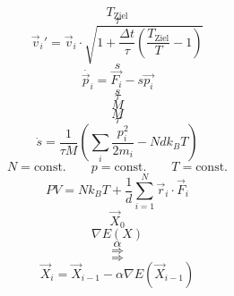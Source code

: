 \documentclass{scrreprt}
\begin{document}
\begin{equation}
T_\text{Ziel}
\end{equation}
\begin{equation}
\tau
\end{equation}
\begin{equation}
  \vec v_i' = \vec v_i \cdot \sqrt{1 + \frac{\Delta t}{\tau} \left(\frac{T_\text{Ziel}}{T} - 1\right)}
  \label{eq:berendsen}
\end{equation}
\begin{equation}
s
\end{equation}
\begin{equation}
  \dot{\vec p_i} = \vec{F_i} - s \vec{p_i}
\end{equation}
\begin{equation}
s
\end{equation}
\begin{equation}
\tau
\end{equation}
\begin{equation}
M
\end{equation}
\begin{equation}
M
\end{equation}
\begin{equation}
\tau
\end{equation}
\begin{equation}
  \dot s = \frac{1}{\tau M} \left(\sum_i{\frac{p_i^2}{2m_i}} - N d k_B T\right)
\end{equation}
\begin{equation}
  N = \text{const.}
  \qquad
  p = \text{const.}
  \qquad
  T = \text{const.}
\end{equation}
\begin{equation}
  P V = N k_B T + \frac{1}{d} \sum_{i=1}^N{\vec{r}_i \cdot \vec{F}_i}
\end{equation}
\begin{equation}
\vec X_0
\end{equation}
\begin{equation}
\nabla E(X)
\end{equation}
\begin{equation}
\alpha
\end{equation}
\begin{equation}
\Rightarrow
\end{equation}
\begin{equation}
\Rightarrow
\end{equation}
\begin{equation}
  \vec X_i = \vec X_{i-1} - \alpha \nabla E(\vec X_{i-1})
\end{equation}
\end{document}
